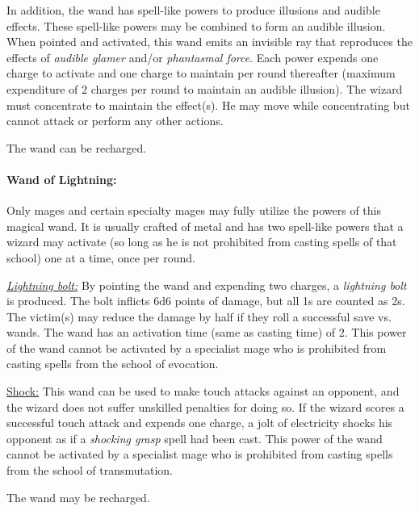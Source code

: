 \begin{multicols}{2}
In addition, the wand has spell-like powers to produce illusions and audible effects.  These spell-like powers may be combined to form an audible illusion.  When pointed and activated, this wand emits an invisible ray that reproduces the effects of \textit{audible glamer} and/or \textit{phantasmal force}.  Each power expends one charge to activate and one charge to maintain per round thereafter (maximum expenditure of 2 charges per round to maintain an audible illusion).  The wizard must concentrate to maintain the effect(s).  He may move while concentrating but cannot attack or perform any other actions.  

The wand can be recharged.

\paragraph{Wand of Lightning:} Only mages and certain specialty mages may fully utilize the powers of this magical wand.  It is usually crafted of metal and has two spell-like powers that a wizard may activate (so long as he is not prohibited from casting spells of that school) one at a time, once per round.

\underline{\textit{Lightning bolt:}} By pointing the wand and expending two charges, a \textit{lightning bolt} is produced.  The bolt inflicts 6d6 points of damage, but all 1s are counted as 2s.  The victim(s) may reduce the damage by half if they roll a successful save vs. wands.  The wand has an activation time (same as casting time) of 2.  This power of the wand cannot be activated by a specialist mage who is prohibited from casting spells from the school of evocation.

\underline{Shock:} This wand can be used to make touch attacks against an opponent, and the wizard does not suffer unskilled penalties for doing so.  If the wizard scores a successful touch attack and expends one charge, a jolt of electricity shocks his opponent as if a \textit{shocking grasp} spell had been cast.  This power of the wand cannot be activated by a specialist mage who is prohibited from casting spells from the school of transmutation.

The wand may be recharged.


\end{multicols}
